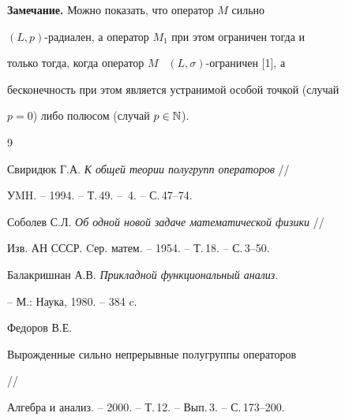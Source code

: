 {\bf Замечание.} Можно показать, что оператор $M$ сильно


$(L,p)$-радиален, а оператор $M_1$ при этом ограничен тогда и


только тогда, когда оператор $M$ \ $(L,\sigma)$-ограничен [1], а


бесконечность при этом является устранимой особой точкой (случай


$p=0$) либо полюсом (случай $p\in{\Bbb N}$).








\begin{thebibliography}{9}







Свиридюк Г.А. {\it К общей теории полугрупп операторов} //


УMH. -- 1994. -- Т.\,49. -- \No\,4. -- С.\,47--74.




Соболев С.Л. {\it Об одной новой задаче математической физики} //


Изв. АН СССР. Cер. матем. -- 1954. -- Т.\,18. -- С.\,3--50.




Балакришнан А.В. {\it Прикладной функциональный анализ}.


-- М.: Наука, 1980. -- 384 c.




Федоров В.Е. {\it


Вырожденные сильно непрерывные полугруппы операторов} //


Алгебра и анализ. -- 2000. -- Т.\,12. -- Вып.\,3. -- С.\,173--200.





\end{thebibliography}





\vskip 2cm











\label{end}

















